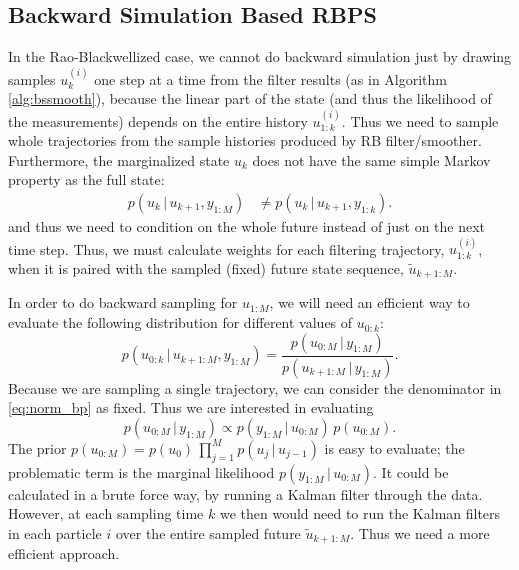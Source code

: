 \documentclass[twocolumn]{autart}    %
\begin{document}
\subsection{Backward Simulation Based RBPS}
%
In the Rao-Blackwellized case, we cannot do backward simulation just
by drawing samples $u_k^{(i)}$ one step at a time from the filter
results (as in Algorithm \ref{alg:bssmooth}), because the linear part
of the state (and thus the likelihood of the measurements) depends on
the entire history $u^{(i)}_{1:k}$. Thus we need to sample whole
trajectories from the sample histories produced by RB
filter/smoother. Furthermore, the marginalized state $u_k$ does not
have the same simple Markov property as the full state:
%
\begin{equation}
  \begin{split}
    p(u_{k}\,|\,u_{k+1},y_{1:M})
    &\ne p(u_{k}\,|\,u_{k+1},y_{1:k}).
  \end{split}
  \nonumber
\end{equation}
%
and thus we need to condition on the whole future instead of just on
the next time step. Thus, we must calculate weights for each filtering
trajectory, $u^{(i)}_{1:k}$, when it is paired with the sampled
(fixed) future state sequence, $\tilde{u}_{k+1:M}$.

In order to do backward sampling for $u_{1:M}$, we will need an
efficient way to evaluate the following distribution for different
values of $u_{0:k}$:
%
\begin{equation}
  p(u_{0:k}\,|\,u_{k+1:M},y_{1:M})
  = \frac{p(u_{0:M}\,|\,y_{1:M})}{p(u_{k+1:M}\,|\,y_{1:M})}.
\label{eq:norm_bp}
\end{equation}
%
Because we are sampling a single trajectory, we can consider the
denominator in \eqref{eq:norm_bp} as fixed. Thus we are interested in
evaluating
%
\begin{equation}
  p(u_{0:M}\,|\,y_{1:M}) \propto p(y_{1:M}\,|\,u_{0:M}) \, p(u_{0:M}).
\end{equation}
%
The prior $p(u_{0:M}) = p(u_0) \, \prod_{j=1}^M p(u_{j}\,|\,u_{j-1})$
is easy to evaluate; the problematic term is the marginal likelihood
$p(y_{1:M}\,|\,u_{0:M})$. It could be calculated in a brute force way,
by running a Kalman filter through the data.  However, at each
sampling time $k$ we then would need to run the Kalman filters in each
particle $i$ over the entire sampled future $\tilde{u}_{k+1:M}$. Thus
we need a more efficient approach.
\end{document}
